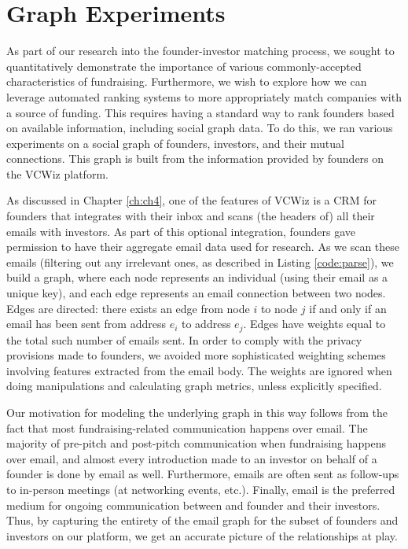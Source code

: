 \chapter{Graph Experiments}
\label{ch:ch5}

As part of our research into the founder-investor matching process, we sought to quantitatively demonstrate the importance of various commonly-accepted characteristics of fundraising. Furthermore, we wish to explore how we can leverage automated ranking systems to more appropriately match companies with a source of funding. This requires having a standard way to rank founders based on available information, including social graph data. To do this, we ran various experiments on a social graph of founders, investors, and their mutual connections. This graph is built from the information provided by founders on the VCWiz platform.

As discussed in Chapter \ref{ch:ch4}, one of the features of VCWiz is a CRM for founders that integrates with their inbox and scans (the headers of) all their emails with investors. As part of this optional integration, founders gave permission to have their aggregate email data used for research. As we scan these emails (filtering out any irrelevant ones, as described in Listing \ref{code:parse}), we build a graph, where each node represents an individual (using their email as a unique key), and each edge represents an email connection between two nodes. Edges are directed: there exists an edge from node $i$ to node $j$ if and only if an email has been sent from address $e_i$ to address $e_j$. Edges have weights equal to the total such number of emails sent. In order to comply with the privacy provisions made to founders, we avoided more sophisticated weighting schemes involving features extracted from the email body. The weights are ignored when doing manipulations and calculating graph metrics, unless explicitly specified.

Our motivation for modeling the underlying graph in this way follows from the fact that most fundraising-related communication happens over email. The majority of pre-pitch and post-pitch communication when fundraising happens over email, and almost every introduction made to an investor on behalf of a founder is done by email as well. Furthermore, emails are often sent as follow-ups to in-person meetings (at networking events, etc.). Finally, email is the preferred medium for ongoing communication between and founder and their investors. Thus, by capturing the entirety of the email graph for the subset of founders and investors on our platform, we get an accurate picture of the relationships at play.

